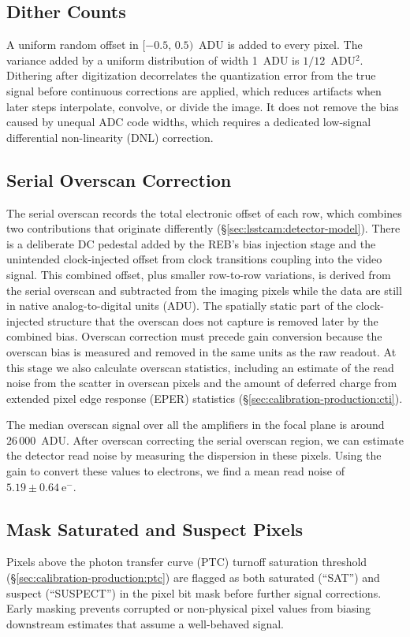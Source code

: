 \subsection{Dither Counts}
A uniform random offset in $[-0.5,\,0.5)$~ADU is added to every pixel. The variance added by a uniform distribution of width 1~ADU is $1/12$~ADU$^2$.
Dithering after digitization decorrelates the quantization error from the true signal before continuous corrections are applied, which reduces artifacts when later steps interpolate, convolve, or divide the image.
It does not remove the bias caused by unequal ADC code widths, which requires a dedicated low-signal differential non-linearity (DNL) correction.

\subsection{Serial Overscan Correction}
The serial overscan records the total electronic offset of each row, which combines two contributions that originate differently (\S\ref{sec:lsstcam:detector-model}).
There is a deliberate DC pedestal added by the REB's bias injection stage and the unintended clock-injected offset from clock transitions coupling into the video signal.
This combined offset, plus smaller row-to-row variations, is derived from the serial overscan and subtracted from the imaging pixels while the data are still in native analog-to-digital units (ADU).
The spatially static part of the clock-injected structure that the overscan does not capture is removed later by the combined bias.
Overscan correction must precede gain conversion because the overscan bias is measured and removed in the same units as the raw readout.
At this stage we also calculate overscan statistics, including an estimate of the read noise from the scatter in overscan pixels and the amount of deferred charge from extended pixel edge response (EPER) statistics (\S\ref{sec:calibration-production:cti}).

The median overscan signal over all the amplifiers in the focal plane is around $26\,000$~ADU\@.   %
After overscan correcting the serial overscan region, we can estimate the detector read noise by measuring the dispersion in these pixels.
Using the gain to convert these values to electrons, we find a mean read noise of $5.19 \pm 0.64~\mathrm{e}^{-}$.  %

\subsection{Mask Saturated and Suspect Pixels}
Pixels above the photon transfer curve (PTC) turnoff saturation threshold (\S\ref{sec:calibration-production:ptc}) are flagged as both saturated (``SAT'') and suspect (``SUSPECT'') in the pixel bit mask before further signal corrections.
Early masking prevents corrupted or non-physical pixel values from biasing downstream estimates that assume a well-behaved signal.

